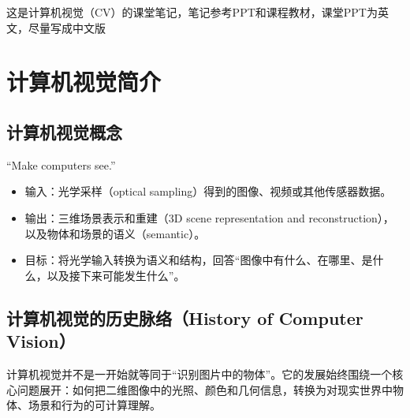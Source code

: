 \documentclass{ctexart}
\begin{document}
这是计算机视觉（CV）的课堂笔记，笔记参考PPT和课程教材，课堂PPT为英文，尽量写成中文版

\section{计算机视觉简介}

\subsection{计算机视觉概念}

``Make computers see.''

\begin{itemize}
\item 输入：光学采样（optical sampling）得到的图像、视频或其他传感器数据。
\item 输出：三维场景表示和重建（3D scene representation and reconstruction），以及物体和场景的语义（semantic）。
\item 目标：将光学输入转换为语义和结构，回答“图像中有什么、在哪里、是什么，以及接下来可能发生什么”。
\end{itemize}

\subsection{计算机视觉的历史脉络（History of Computer Vision）}

计算机视觉并不是一开始就等同于“识别图片中的物体”。它的发展始终围绕一个核心问题展开：如何把二维图像中的光照、颜色和几何信息，转换为对现实世界中物体、场景和行为的可计算理解。
\end{document}
